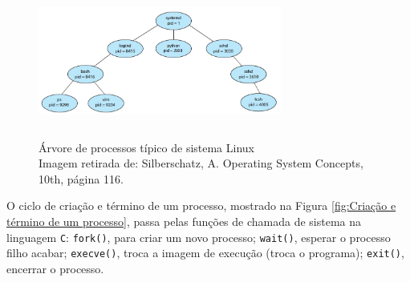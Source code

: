 \begin{figure}[H]
\centering
\includegraphics[width=8cm, height=5cm]{imagens/05/05 - Arvore de processos em um sistema linux.png}
\caption{Árvore de processos típico de sistema Linux   \\
Imagem retirada de: Silberschatz, A. Operating System Concepts, 10th,
página 116. \\}
\label{fig:Árvore de processos típico de sistema Linux}
\end{figure}


O ciclo de criação e término de um processo, mostrado na Figura \ref{fig:Criação e término de um processo}, passa
pelas funções de chamada de sistema na linguagem \texttt{C}:
\texttt{fork()}, para criar um novo processo; \texttt{wait()}, esperar o
processo filho acabar; \texttt{execve()}, troca a imagem de execução
(troca o programa); \texttt{exit()}, encerrar o processo.


